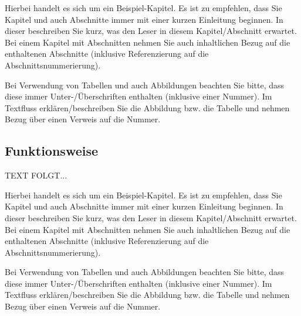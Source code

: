 \documentclass[a4paper,12pt,oneside]{article}
\begin{document}
    \vspace{1cm}
 \begin{tcolorbox}[title={Das Kapitel/der Abschnitt}]
Hierbei handelt es sich um ein Beispiel-Kapitel. Es ist zu empfehlen, dass Sie Kapitel und auch Abschnitte immer mit einer kurzen Einleitung beginnen. In dieser beschreiben Sie kurz, was den Leser in diesem Kapitel/Abschnitt erwartet. Bei einem Kapitel mit Abschnitten nehmen Sie auch inhaltlichen Bezug auf die enthaltenen Abschnitte (inklusive Referenzierung auf die Abschnittsnummerierung).
  \end{tcolorbox}
  
    \vspace{1cm}
 \begin{tcolorbox}[title={Abbildungen, Tabellen \& Co.}]
Bei Verwendung von Tabellen und auch Abbildungen beachten Sie bitte, dass diese immer Unter-/Überschriften enthalten (inklusive einer Nummer). Im Textfluss erklären/beschreiben Sie die Abbildung bzw. die Tabelle und nehmen Bezug über einen Verweis auf die Nummer.
  \end{tcolorbox}

  \newpage
  \subsection{Funktionsweise}\label{Funktionsweise}
     TEXT FOLGT... 
     
    \vspace{1cm}
 \begin{tcolorbox}[title={Das Kapitel/der Abschnitt}]
Hierbei handelt es sich um ein Beispiel-Kapitel. Es ist zu empfehlen, dass Sie Kapitel und auch Abschnitte immer mit einer kurzen Einleitung beginnen. In dieser beschreiben Sie kurz, was den Leser in diesem Kapitel/Abschnitt erwartet. Bei einem Kapitel mit Abschnitten nehmen Sie auch inhaltlichen Bezug auf die enthaltenen Abschnitte (inklusive Referenzierung auf die Abschnittsnummerierung).
  \end{tcolorbox}
  
    \vspace{1cm}
 \begin{tcolorbox}[title={Abbildungen, Tabellen \& Co.}]
Bei Verwendung von Tabellen und auch Abbildungen beachten Sie bitte, dass diese immer Unter-/Überschriften enthalten (inklusive einer Nummer). Im Textfluss erklären/beschreiben Sie die Abbildung bzw. die Tabelle und nehmen Bezug über einen Verweis auf die Nummer.
  \end{tcolorbox}
\end{document}
